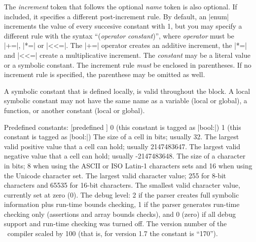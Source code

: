             \noindent{}%
            The {\it increment\/} token that follows the optional {\it name\/}
            token is also optional. If included, it specifies a different
            post-increment rule. By default, an |enum| increments the value of
            every succesive constant with 1, but you may specify a different
            rule with the syntax ``({\it operator\/} {\it constant})'', where
            {\it operator\/} must be |+=|, |*=| or |<<=|. The |+=| operator
            creates an additive increment, the |*=| and |<<=| create a
            multiplicative increment. The {\it constant\/} may be a literal
            value or a symbolic constant. The increment rule {\it must\/} be
            enclosed in parentheses. If no increment rule is specified, the
            parenthese may be omitted as well.

    \endlist

    A symbolic constant that is defined locally, is valid throughout the
    block. A local symbolic constant may not have the same name as a
    variable (local or global), a function, or another constant (local or
    global).

\item Predefined constants: 
        [predefined \midtilde]
        \eatvskip
        \beginlist{50pt}\compactlist
            0 (this constant is tagged as |bool:|)
             1 (this constant is tagged as |bool:|)
         The size of a cell in bits; usually 32.
          The largest valid positive value that a cell can
                            hold; usually 2147483647.
          The largest valid negative value that a cell can
                            hold; usually -2147483648.
         The size of a character in bits; 8 when using the
                            ASCII or ISO Latin-1 characters sets and 16 when
                            using the Unicode character set.
                              
          The largest valid character value; 255 for 8-bit
                            characters and 65535 for 16-bit characters.
          The smallest valid character value, currently set
                            at zero (0).
             
                            The debug level: 2 if the parser creates full symbolic
                            information plus run-time bounds checking, 1 if the
                            parser generates run-time checking only (assertions
                            and array bounds checks), and 0 (zero) if all debug
                            support and run-time checking was turned off.
          The version number of the \Small\ compiler scaled by
                            100 (that is, for version 1.7 the constant is
                            ``170'').
        \endlist

